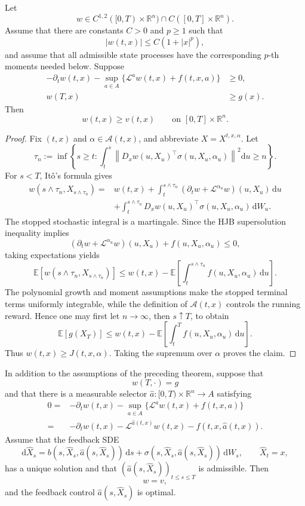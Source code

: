 \begin{thm}
Let
\[
w\in C^{1,2}([0,T)\times\mathbb R^n)
\cap C([0,T]\times\mathbb R^n).
\]
Assume that there are constants \(C>0\) and \(p\ge1\) such that
\[
|w(t,x)|\le C(1+|x|^p),
\]
and assume that all admissible state processes have the corresponding \(p\)-th moments needed below. Suppose
\[
\begin{aligned}
-\partial_t w(t,x)
-\sup_{a\in A}
\{\mathcal L^aw(t,x)+f(t,x,a)\}
&\ge0,\\
w(T,x)&\ge g(x).
\end{aligned}
\]
Then
\[
w(t,x)\ge v(t,x)
\qquad\text{on }[0,T]\times\mathbb R^n.
\]
\end{thm}

\begin{proof}
Fix \((t,x)\) and \(\alpha\in\mathcal A(t,x)\), and abbreviate \(X=X^{t,x,\alpha}\). Let
\[
\tau_n
:=\inf\left\{
 s\ge t:
 \int_t^s
 \left\|
 D_xw(u,X_u)^\top\sigma(u,X_u,\alpha_u)
 \right\|^2\mathrm du
 \ge n
\right\}.
\]
For \(s<T\), It\^o's formula gives
\[
\begin{aligned}
w(s\wedge\tau_n,X_{s\wedge\tau_n})
={}&w(t,x)
+\int_t^{s\wedge\tau_n}
(\partial_t w+\mathcal L^{\alpha_u}w)(u,X_u)\,\mathrm du\\
&+\int_t^{s\wedge\tau_n}
D_xw(u,X_u)^\top
\sigma(u,X_u,\alpha_u)\,\mathrm dW_u.
\end{aligned}
\]
The stopped stochastic integral is a martingale. Since the HJB supersolution inequality implies
\[
(\partial_t w+\mathcal L^{\alpha_u}w)(u,X_u)
+f(u,X_u,\alpha_u)
\le0,
\]
taking expectations yields
\[
\mathbb E[w(s\wedge\tau_n,X_{s\wedge\tau_n})]
\le
w(t,x)
-\mathbb E\!\left[
\int_t^{s\wedge\tau_n}f(u,X_u,\alpha_u)\,\mathrm du
\right].
\]
The polynomial growth and moment assumptions make the stopped terminal terms uniformly integrable, while the definition of \(\mathcal A(t,x)\) controls the running reward. Hence one may first let \(n\to\infty\), then \(s\uparrow T\), to obtain
\[
\mathbb E[g(X_T)]
\le
w(t,x)
-\mathbb E\!\left[
\int_t^T f(u,X_u,\alpha_u)\,\mathrm du
\right].
\]
Thus \(w(t,x)\ge J(t,x,\alpha)\). Taking the supremum over \(\alpha\) proves the claim.
\end{proof}

\begin{thm}
In addition to the assumptions of the preceding theorem, suppose that
\[
w(T,\cdot)=g
\]
and that there is a measurable selector \(\hat a:[0,T)\times\mathbb R^n\to A\) satisfying
\[
\begin{aligned}
0
={}&-\partial_t w(t,x)
-\sup_{a\in A}\{\mathcal L^aw(t,x)+f(t,x,a)\}\\
={}&-\partial_t w(t,x)
-\mathcal L^{\hat a(t,x)}w(t,x)
-f(t,x,\hat a(t,x)).
\end{aligned}
\]
Assume that the feedback SDE
\[
\mathrm d\hat X_s
=b(s,\hat X_s,\hat a(s,\hat X_s))\,\mathrm ds
+\sigma(s,\hat X_s,\hat a(s,\hat X_s))\,\mathrm dW_s,
\qquad \hat X_t=x,
\]
has a unique solution and that \((\hat a(s,\hat X_s))_{t\le s\le T}\) is admissible. Then
\[
w=v,
\]
and the feedback control \(\hat a(s,\hat X_s)\) is optimal.
\end{thm}

